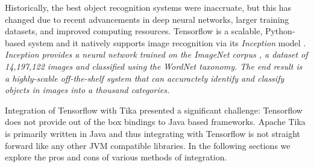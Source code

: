 Historically, the best object recognition systems were inaccruate, but this has changed due to recent advancements in deep neural networks, larger training datasets, and improved computing resources. Tensorflow is a scalable, Python-based system and it natively supports image recognition via its {\em Inception} model \cite{abadi2016tensorflow}. \em{Inception} provides a neural network trained on the ImageNet corpus \cite{krizhevsky2012imagenet}, a dataset of 14,197,122 images and classified using the WordNet taxonomy. The end result is a highly-scable off-the-shelf system that can accuractely identify and classify objects in images into a thousand categories. 

Integration of Tensorflow with Tika presented a significant challenge: Tensorflow does not provide out of the box bindings to Java based frameworks. Apache Tika is primarily written in Java and thus integrating with Tensorflow is not straight forward like any other JVM compatible libraries. In the following sections we explore the pros and cons of various methods of integration.




